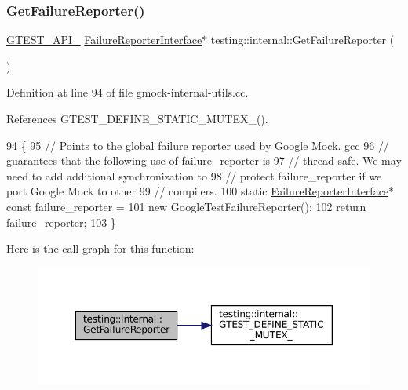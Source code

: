 \subsubsection{\texorpdfstring{Get\+Failure\+Reporter()}{GetFailureReporter()}}
{\footnotesize\ttfamily \hyperlink{gtest-port_8h_aa73be6f0ba4a7456180a94904ce17790}{G\+T\+E\+S\+T\+\_\+\+A\+P\+I\+\_\+} \hyperlink{classFailureReporterInterface}{Failure\+Reporter\+Interface}$\ast$ testing\+::internal\+::\+Get\+Failure\+Reporter (\begin{DoxyParamCaption}{ }\end{DoxyParamCaption})}



Definition at line 94 of file gmock-\/internal-\/utils.\+cc.



References G\+T\+E\+S\+T\+\_\+\+D\+E\+F\+I\+N\+E\+\_\+\+S\+T\+A\+T\+I\+C\+\_\+\+M\+U\+T\+E\+X\+\_\+().


\begin{DoxyCode}
94                                                           \{
95   \textcolor{comment}{// Points to the global failure reporter used by Google Mock.  gcc}
96   \textcolor{comment}{// guarantees that the following use of failure\_reporter is}
97   \textcolor{comment}{// thread-safe.  We may need to add additional synchronization to}
98   \textcolor{comment}{// protect failure\_reporter if we port Google Mock to other}
99   \textcolor{comment}{// compilers.}
100   \textcolor{keyword}{static} \hyperlink{classFailureReporterInterface}{FailureReporterInterface}* \textcolor{keyword}{const} failure\_reporter =
101       \textcolor{keyword}{new} GoogleTestFailureReporter();
102   \textcolor{keywordflow}{return} failure\_reporter;
103 \}
\end{DoxyCode}
Here is the call graph for this function\+:
\nopagebreak
\begin{figure}[H]
\begin{center}
\leavevmode
\includegraphics[width=350pt]{namespacetesting_1_1internal_aa261c22df383e9007129c92e36e30e62_cgraph}
\end{center}
\end{figure}
\mbox{\label{namespacetesting_1_1internal_a06ca3f65f5e85c9ce7299b9e4cd52408}} 

